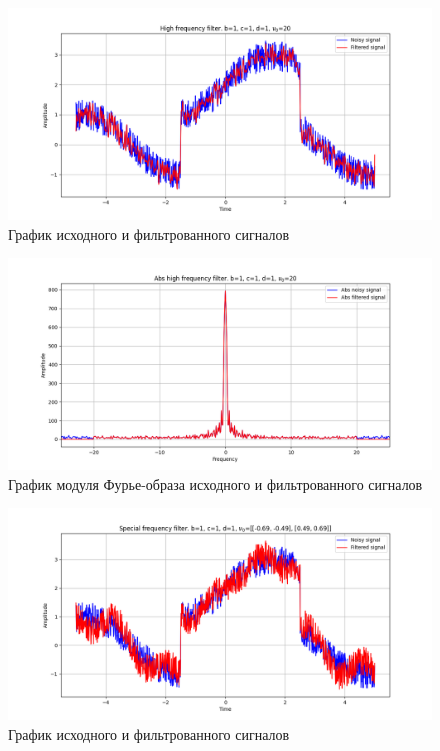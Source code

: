 \documentclass[a4paper, 12pt]{article}
\begin{document}
    \begin{figure}[!htb]
        \centering
        \includegraphics[scale=0.485]{5_u_flt_u_nospec.png}
        \captionsetup{skip=0pt}
        \caption{График исходного и фильтрованного сигналов}
        \label{fig:fig93}
    \end{figure}
    \begin{figure}[!htb]
        \centering
        \includegraphics[scale=0.485]{5_abs_u_U_nospec.png}
        \captionsetup{skip=0pt}
        \caption{График модуля Фурье-образа исходного и фильтрованного сигналов}
        \label{fig:fig94}
    \end{figure}
    \begin{figure}[!htb]
        \centering
        \includegraphics[scale=0.485]{5_1_u_flt_u_nospec.png}
        \captionsetup{skip=0pt}
        \caption{График исходного и фильтрованного сигналов}
        \label{fig:fig95}
    \end{figure}
\end{document}
